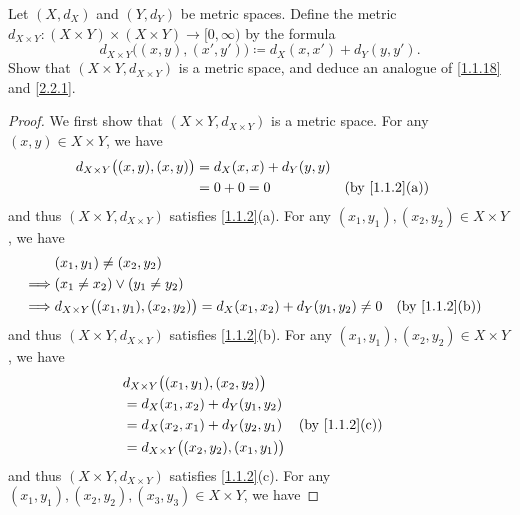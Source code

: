 \begin{ex}\label{ex:2.2.8}
  Let \((X, d_X)\) and \((Y, d_Y)\) be metric spaces.
  Define the metric \(d_{X \times Y} : (X \times Y) \times (X \times Y) \to [0, \infty)\) by the formula
  \[
    d_{X \times Y}\big((x, y), (x', y')\big) \coloneqq d_X(x, x') + d_Y(y, y').
  \]
  Show that \((X \times Y, d_{X \times Y})\) is a metric space, and deduce an analogue of \cref{1.1.18} and \cref{2.2.1}.
\end{ex}

\begin{proof}
  We first show that \((X \times Y, d_{X \times Y})\) is a metric space.
  For any \((x, y) \in X \times Y\), we have
  \begin{align*}
    d_{X \times Y}\big((x, y), (x, y)\big) & = d_X(x, x) + d_Y(y, y)                                  \\
                                           & = 0 + 0 = 0             &  & \text{(by \cref{1.1.2}(a))}
  \end{align*}
  and thus \((X \times Y, d_{X \times Y})\) satisfies \cref{1.1.2}(a).
  For any \((x_1, y_1), (x_2, y_2) \in X \times Y\), we have
  \begin{align*}
             & (x_1, y_1) \neq (x_2, y_2)                                                                                             \\
    \implies & (x_1 \neq x_2) \lor (y_1 \neq y_2)                                                                                     \\
    \implies & d_{X \times Y}\big((x_1, y_1), (x_2, y_2)\big) = d_X(x_1, x_2) + d_Y(y_1, y_2) \neq 0 &  & \text{(by \cref{1.1.2}(b))}
  \end{align*}
  and thus \((X \times Y, d_{X \times Y})\) satisfies \cref{1.1.2}(b).
  For any \((x_1, y_1), (x_2, y_2) \in X \times Y\), we have
  \begin{align*}
     & d_{X \times Y}\big((x_1, y_1), (x_2, y_2)\big)                                    \\
     & = d_X(x_1, x_2) + d_Y(y_1, y_2)                                                   \\
     & = d_X(x_2, x_1) + d_Y(y_2, y_1)                  &  & \text{(by \cref{1.1.2}(c))} \\
     & = d_{X \times Y}\big((x_2, y_2), (x_1, y_1)\big)
  \end{align*}
  and thus \((X \times Y, d_{X \times Y})\) satisfies \cref{1.1.2}(c).
  For any \((x_1, y_1), (x_2, y_2), (x_3, y_3) \in X \times Y\), we have

\end{proof}
